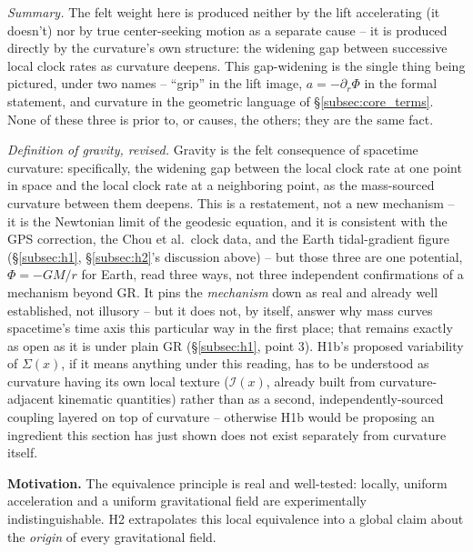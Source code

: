 \documentclass[12pt, a4paper]{article}
\begin{document}
\emph{Summary.} The felt weight here is produced neither by the lift
accelerating (it doesn't) nor by true center-seeking motion as a
separate cause -- it is produced directly by the curvature's own
structure: the widening gap between successive local clock rates as
curvature deepens. This gap-widening is the single thing being
pictured, under two names -- ``grip'' in the lift image, $a=-\partial_r
\Phi$ in the formal statement, and curvature in the geometric
language of \S\ref{subsec:core_terms}. None of these three is prior
to, or causes, the others; they are the same fact.

\emph{Definition of gravity, revised.} Gravity is the felt
consequence of spacetime curvature: specifically, the widening gap
between the local clock rate at one point in space and the local
clock rate at a neighboring point, as the mass-sourced curvature
between them deepens. This is a restatement, not a new mechanism --
it is the Newtonian limit of the geodesic equation, and it is
consistent with the GPS correction, the Chou et al.\ clock data, and
the Earth tidal-gradient figure (\S\ref{subsec:h1}, \S\ref{subsec:h2}'s
discussion above) -- but those three are one potential, $\Phi=-GM/r$
for Earth, read three ways, not three independent confirmations of a
mechanism beyond GR. It pins the \emph{mechanism} down as real and
already well established, not illusory -- but it does not, by itself,
answer why mass curves spacetime's time axis this particular way in
the first place; that remains exactly as open as it is under plain GR
(\S\ref{subsec:h1}, point 3). H1b's
proposed variability of $\Sigma(x)$, if it means anything under this
reading, has to be understood as curvature having its own local
texture ($\mathcal{I}(x)$, already built from curvature-adjacent
kinematic quantities) rather than as a second, independently-sourced
coupling layered on top of curvature -- otherwise H1b would be
proposing an ingredient this section has just shown does not exist
separately from curvature itself.

\textbf{Motivation.} The equivalence principle is real and
well-tested: locally, uniform acceleration and a uniform gravitational
field are experimentally indistinguishable. H2 extrapolates this local
equivalence into a global claim about the \emph{origin} of every
gravitational field.
\end{document}
